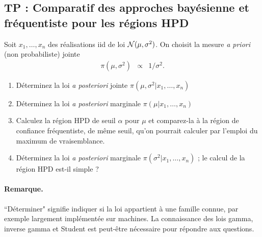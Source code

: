 \subsection{TP : Comparatif des approches bayésienne et fréquentiste pour les régions HPD }

Soit $x_1,\ldots,x_n$ des réalisations iid de loi ${\cal{N}}(\mu,\sigma^2)$. On choisit la mesure {\it a priori} (non probabiliste) jointe
\begin{eqnarray*}
\pi(\mu,\sigma^2) & \propto & 1/\sigma^2.
\end{eqnarray*}
\begin{enumerate}
\item Déterminez la loi {\it a posteriori} jointe $\pi(\mu,\sigma^2|x_1,\ldots,x_n)$ 
\item Déterminez la loi {\it a posteriori} marginale $\pi(\mu|x_1,\ldots,x_n)$ 
\item Calculez la région HPD de seuil $\alpha$ pour $\mu$ et comparez-la à la région de confiance fréquentiste, de même seuil, qu'on pourrait calculer par l'emploi du maximum de vraisemblance.
\item Déterminez la loi {\it a posteriori} marginale $\pi(\sigma^2|x_1,\ldots,x_n)$ ; le calcul de la région HPD est-il simple ?
\end{enumerate}
\paragraph{Remarque.} ``Déterminer" signifie indiquer si la loi appartient à une famille connue, par exemple largement implémentée sur machines. La connaissance des lois gamma, inverse gamma et Student est peut-être nécessaire pour répondre aux questions.

\if{} 
\fi